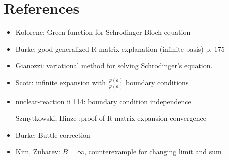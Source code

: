 \documentclass[12pt, a4paper]{article}
\begin{document}
\section{References}
\begin{itemize}
\item Kolorenc: Green function for Schrodinger-Bloch equation
\item Burke: good generalized R-matrix explanation (infinite basis) p. 175
\item Gianozzi: variational method for solving Schrodinger's equation.
\item Scott: infinite expansion with $\frac{\varphi(a)}{\varphi(a)}$ boundary conditions
\item nuclear-reaction ii 114: boundary condition independence
\item [Szmytkowski, Hinze] :proof of R-matrix expansion convergence
\item Burke: Buttle correction
\item Kim, Zubarev: $B = \infty$, counterexample for changing limit and sum
\end{itemize}
\end{document}

